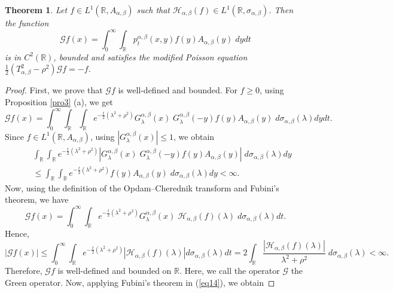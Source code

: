 \documentclass[a4paper,11pt, reqno]{amsart}
\theoremstyle{plain}
\newtheorem{theorem}{Theorem}[section]
\theoremstyle{definition}
\theoremstyle{remark}
\def \R{{\mathbb R}}
\def\R{\mathbb R}
\def \H{{\mathcal H}}
\begin{document}
\begin{theorem}\label{th4}
Let $f \in L^1(\R, A_{\alpha, \beta})$ such that $\H_{\alpha, \beta} (f) \in L^1(\R, \sigma_{\alpha, \beta})$. Then the function 
\begin{equation}\label{eq13}
\mathcal{G} f(x)= \int_0^{\infty} \int_{\R} p^{\alpha, \beta}_t(x, y) f(y) A_{\alpha, \beta}(y) \;dy dt
\end{equation}
is in $C^2(\R)$, bounded and satisfies the modified Poisson equation $\frac{1}{2}\left(T^2_{\alpha, \beta} - \rho^2 \right) \mathcal{G} f=-f$. 
\end{theorem}
\begin{proof}
First, we prove that $\mathcal{G} f$ is well-defined and bounded. For $f \geq 0$, using Proposition \ref{pro3} (a), we get
\[ \mathcal{G} f(x)= \int_0^{\infty} \int_{\R} \int_{\mathbb{R}}  e^{-\frac{t}{2}\left( \lambda^2+\rho^2\right)}  G^{\alpha, \beta}_\lambda(x)\;  G^{\alpha, \beta}_\lambda(-y)  f(y) A_{\alpha, \beta}(y) \; d\sigma_{\alpha, \beta}(\lambda) dy dt. \]
Since $f \in L^1(\R, A_{\alpha, \beta})$, using $|G^{\alpha, \beta}_\lambda(x) | \leq 1$, we obtain
\begin{eqnarray*}
&& \int_{\R} \int_{\mathbb{R}}  e^{-\frac{t}{2}\left( \lambda^2+\rho^2\right)} \left| G^{\alpha, \beta}_\lambda(x)\;  G^{\alpha, \beta}_\lambda(-y)  f(y) A_{\alpha, \beta}(y) \right| \; d\sigma_{\alpha, \beta}(\lambda) dy \\
&& \leq \int_{\R} \int_{\mathbb{R}}  e^{-\frac{t}{2}\left( \lambda^2+\rho^2\right)} f(y) A_{\alpha, \beta}(y) \; d\sigma_{\alpha, \beta}(\lambda) dy < \infty.  
\end{eqnarray*}
Now, using the definition of the Opdam--Cherednik transform and Fubini's theorem, we have
\begin{equation}\label{eq14}
\mathcal{G} f(x)= \int_0^{\infty} \int_{\R}  e^{-\frac{t}{2}\left( \lambda^2+\rho^2\right)}  G^{\alpha, \beta}_\lambda(x)\; \H_{\alpha, \beta} (f) (\lambda) \; d\sigma_{\alpha, \beta}(\lambda) dt.
\end{equation}
Hence,
\[ |\mathcal{G} f(x)| \leq \int_0^{\infty} \int_{\R}  e^{-\frac{t}{2}\left( \lambda^2+\rho^2\right)}  \left| \H_{\alpha, \beta} (f) (\lambda) \right| d\sigma_{\alpha, \beta}(\lambda) dt
= 2  \int_{\R} \frac{\left| \H_{\alpha, \beta} (f) (\lambda) \right|}{\lambda^2+\rho^2} \; d\sigma_{\alpha, \beta}(\lambda) <\infty. \]
Therefore, $\mathcal{G} f$ is well-defined and bounded on $\R$. Here, we call the operator $\mathcal{G}$ the Green operator. Now, applying Fubini's theorem in (\ref{eq14}), we obtain

\end{proof}
\end{document}
